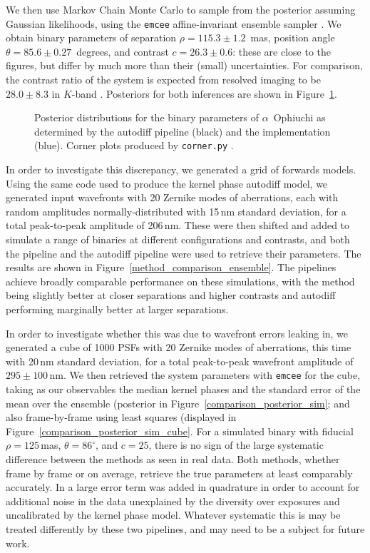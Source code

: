 \documentclass[modern]{aastex63}
\begin{document}
We then use Markov Chain Monte Carlo \citep{metropolis53} to sample from the posterior assuming Gaussian likelihoods, using the \texttt{emcee} affine-invariant ensemble sampler \citep{emcee}. We obtain binary parameters of separation $\rho = 115.3 \pm 1.2$~mas, position angle $\theta = 85.6 \pm 0.27$~degrees, and contrast $c = 26.3 \pm 0.6$: these are close to the \citet{martinache20} figures, but differ by much more than their (small) uncertainties. For comparison, the contrast ratio of the system is expected from resolved imaging to be $28.0 \pm 8.3$ in $K$-band \citep{hinkley11}. Posteriors for both inferences are shown in Figure~\ref{comparison_posterior}. 

\begin{figure}
\caption{Posterior distributions for the binary parameters of $\alpha$~Ophiuchi as determined by the autodiff pipeline (black) and the \citet{martinache20} implementation (blue). Corner plots produced by \texttt{corner.py} \citep{corner}. \label{comparison_posterior}}
\end{figure}

In order to investigate this discrepancy, we generated a grid of forwards models. Using the same code used to produce the kernel phase autodiff model, we generated input wavefronts with 20 Zernike modes of aberrations, each with random amplitudes normally-distributed with 15\,nm standard deviation, for a total peak-to-peak amplitude of 206\,nm. These were then shifted and added to simulate a range of binaries at different configurations and contrasts, and both the \citet{martinache20} pipeline and the autodiff pipeline were used to retrieve their parameters. The results are shown in Figure~\ref{method_comparison_ensemble}. The pipelines achieve broadly comparable performance on these simulations, with the \citet{martinache20} method being slightly better at closer separations and higher contrasts and autodiff performing marginally better at larger separations. 

In order to investigate whether this was due to wavefront errors leaking in, we generated a cube of 1000 PSFs with 20 Zernike modes of aberrations, this time with 20\,nm standard deviation, for a total peak-to-peak wavefront amplitude of $295\pm 100$\,nm. We then retrieved the system parameters with \texttt{emcee} for the cube, taking as our observables the median kernel phases and the standard error of the mean over the ensemble (posterior in Figure~\ref{comparison_posterior_sim}; and also frame-by-frame using least squares (displayed in Figure~\ref{comparison_posterior_sim_cube}. For a simulated binary with fiducial $\rho = 125$\,mas, $\theta=86^\circ$, and $c = 25$, there is no sign of the large systematic difference between the methods as seen in real data. Both methods, whether frame by frame or on average, retrieve the true parameters at least comparably accurately. In \citet{martinache20} a large error term was added in quadrature in order to account for additional noise in the data unexplained by the diversity over exposures and uncalibrated by the kernel phase model. Whatever systematic this is may be treated differently by these two pipelines, and may need to be a subject for future work.
\end{document}
